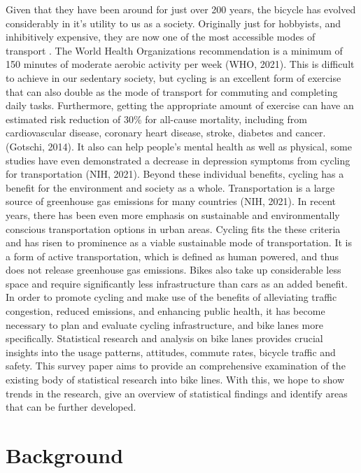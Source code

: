 \documentclass[12pt, letterpaper]{article}
\begin{document}
Given that they have been around for just over 200 years, the bicycle has  evolved considerably in it's utility to us as a society. Originally just for hobbyists, and inhibitively expensive, they are now one of the most accessible modes of transport \cite{BIKE2023}. The World Health Organizations recommendation is a minimum of 150 minutes of moderate aerobic activity per week (WHO, 2021). This is difficult to achieve in our sedentary society, but cycling is an excellent form of exercise that can also double as the mode of transport for commuting and completing daily tasks. Furthermore, getting the appropriate amount of exercise can have an estimated risk reduction of 30\% for all-cause mortality, including from cardiovascular disease, coronary heart disease, stroke, diabetes and cancer. (Gotschi, 2014). It also can help people's mental health as well as physical, some studies have even demonstrated a decrease in depression symptoms from cycling for transportation (NIH, 2021). Beyond these individual benefits, cycling has a benefit for the environment and society as a whole. Transportation is a large source of greenhouse gas emissions for many countries (NIH, 2021). In recent years, there has been even more emphasis on sustainable and environmentally conscious transportation options in urban areas.  Cycling fits the these criteria and has risen to prominence as a viable sustainable mode of transportation. It is a form of active transportation, which is defined as human powered, and thus does not release greenhouse gas emissions. Bikes also take up considerable less space and require significantly less infrastructure than cars as an added benefit. In order to promote cycling and make use of the benefits of alleviating traffic congestion, reduced emissions, and enhancing public health, it has become necessary to plan and evaluate cycling infrastructure, and bike lanes more specifically. Statistical research and analysis on bike lanes provides crucial insights into the usage patterns, attitudes, commute rates, bicycle traffic and safety. This survey paper aims to provide an comprehensive examination of the existing body of statistical research into bike lines. With this, we hope to show trends in the research, give an overview of statistical findings and identify areas that can be further developed.  


\section{Background}
\label{sec:Background}
\end{document}
